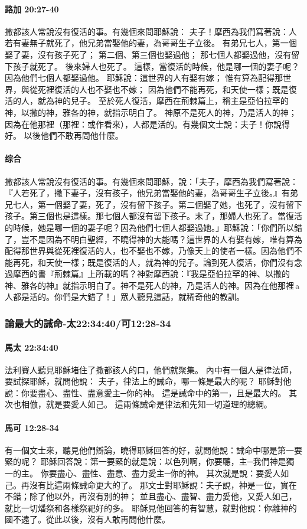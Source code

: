 \paragraph{路加 20:27-40}
撒都該人常說沒有復活的事。有幾個來問耶穌說：
夫子！摩西為我們寫著說：人若有妻無子就死了，他兄弟當娶他的妻，為哥哥生子立後。
有弟兄七人，第一個娶了妻，沒有孩子死了；
第二個、第三個也娶過他；
那七個人都娶過他，沒有留下孩子就死了。
後來婦人也死了。
這樣，當復活的時候，他是哪一個的妻子呢？因為他們七個人都娶過他。
耶穌說：這世界的人有娶有嫁；
惟有算為配得那世界，與從死裡復活的人也不娶也不嫁；
因為他們不能再死，和天使一樣；既是復活的人，就為神的兒子。
至於死人復活，摩西在荊棘篇上，稱主是亞伯拉罕的神，以撒的神，雅各的神，就指示明白了。
神原不是死人的神，乃是活人的神；因為在他那裡（那裡：或作看來），人都是活的。有幾個文士說：夫子！你說得好。
以後他們不敢再問他什麼。
\paragraph{综合}
撒都該人常說沒有復活的事。有幾個來問耶穌，說：「夫子，摩西為我們寫著說：『人若死了，撇下妻子，沒有孩子，他兄弟當娶他的妻，為哥哥生子立後。』有弟兄七人，第一個娶了妻，死了，沒有留下孩子。第二個娶了她，也死了，沒有留下孩子。第三個也是這樣。那七個人都沒有留下孩子。末了，那婦人也死了。當復活的時候，她是哪一個的妻子呢？因為他們七個人都娶過她。」耶穌說：「你們所以錯了，豈不是因為不明白聖經，不曉得神的大能嗎？這世界的人有娶有嫁，唯有算為配得那世界與從死裡復活的人，也不娶也不嫁，乃像天上的使者一樣。因為他們不能再死，和天使一樣；既是復活的人，就為神的兒子。論到死人復活，你們沒有念過摩西的書『荊棘篇』上所載的嗎？神對摩西說：『我是亞伯拉罕的神、以撒的神、雅各的神』就指示明白了。神不是死人的神，乃是活人的神。因為在他那裡 a人都是活的。你們是大錯了！」眾人聽見這話，就稀奇他的教訓。

\subsubsection{論最大的誡命-太22:34:40/可12:28-34}
\paragraph{馬太 22:34:40}
法利賽人聽見耶穌堵住了撒都該人的口，他們就聚集。
內中有一個人是律法師，要試探耶穌，就問他說：
夫子，律法上的誡命，哪一條是最大的呢？
耶穌對他說：你要盡心、盡性、盡意愛主─你的神。
這是誡命中的第一，且是最大的。
其次也相倣，就是要愛人如己。
這兩條誡命是律法和先知一切道理的總綱。
\paragraph{馬可 12:28-34}
有一個文士來，聽見他們辯論，曉得耶穌回答的好，就問他說：誡命中哪是第一要緊的呢？
耶穌回答說：第一要緊的就是說：以色列啊，你要聽，主─我們神是獨一的主。
你要盡心、盡性、盡意、盡力愛主─你的神。
其次就是說：要愛人如己。再沒有比這兩條誡命更大的了。
那文士對耶穌說：夫子說，神是一位，實在不錯；除了他以外，再沒有別的神；
並且盡心、盡智、盡力愛他，又愛人如己，就比一切燔祭和各樣祭祀好的多。
耶穌見他回答的有智慧，就對他說：你離神的國不遠了。從此以後，沒有人敢再問他什麼。
